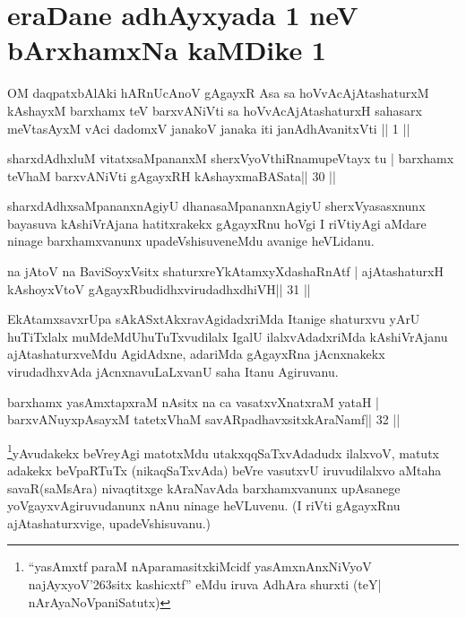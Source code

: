 \section*{eraDane adhAyxyada 1 neV bArxhamxNa kaMDike 1}

\begin{shl}
OM daqpatxbAlAki hARnUcAnoV gAgayxR Asa
sa hoVvAcAjAtashaturxM kAshayxM barxhamx teV barxvANiVti
sa hoVvAcAjAtashaturxH sahasarx meVtasAyxM vAci
dadomxV janakoV janaka iti janAdhAvanitxVti || 1 ||
\end{shl}

\begin{shl}
sharxdAdhxluM vitatxsaMpananxM sherxVyoVthiRnamupeVtayx tu |
barxhamx teV\s haM barxvANiVti gAgayxRH kAshayxmaBASata\hfill || 30 ||
\end{shl}

\begin{artha}
sharxdAdhxsaMpananxnAgiyU dhanasaMpananxnAgiyU sherxVyasasxnunx bayasuva kAshiVrAjana hatitxrakekx gAgayxRnu hoVgi I riVtiyAgi aMdare ninage barxhamxvanunx upadeVshisuveneMdu avanige heVLidanu.
\end{artha}


\begin{shl}
na jAtoV na BaviSoyxV\s sitx shaturxreYkAtamxyXdashaRnAtf |
ajAtashaturxH kAshoyxV\s toV gAgayxRbudidhxvirudadhxdhiVH\hfill || 31 ||
\end{shl}

\begin{artha}
EkAtamxsavxrUpa sAkASxtAkxravAgidadxriMda Itanige shaturxvu yArU huTiTxlalx  muMdeMdUhuTuTxvudilalx IgalU ilalxvAdadxriMda kAshiVrAjanu ajAtashaturxveMdu AgidAdxne, adariMda gAgayxRna jAcnxnakekx virudadhxvAda jAcnxnavuLaLxvanU saha Itanu Agiruvanu.
\end{artha}

\begin{shl}
barxhamx yasAmxtapxraM nAsitx na ca vasatxvXnatxraM yataH |
barxvANuyxpAsayxM tatetxV\s haM savARpadhavxsitxkAraNamf\hfill || 32 ||
\end{shl}

\begin{artha}
\footnote[3]{``yasAmxtf paraM nAparamasitxkiMcidf yasAmxnAnxNiVyoV 
najAyxyoV\char'263sitx kashicxtf'' eMdu iruva AdhAra shurxti (teY| 
nArAyaNoVpaniSatutx)}yAvudakekx beVreyAgi matotxMdu utakxqqSaTxvAdadudx ilalxvoV, matutx adakekx beVpaRTuTx (nikaqSaTxvAda) beVre vasutxvU iruvudilalxvo aMtaha savaR(saMsAra) nivaqtitxge kAraNavAda barxhamxvanunx upAsanege yoVgayxvAgiruvudanunx nAnu ninage heVLuvenu. (I riVti gAgayxRnu ajAtashaturxvige, upadeVshisuvanu.)
\end{artha}

